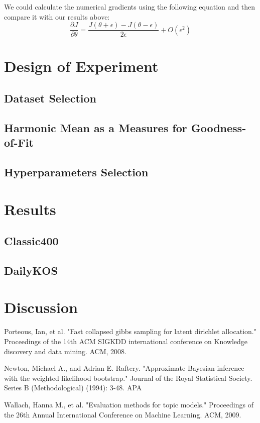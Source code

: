 \documentclass[twoside,12pt]{article}
\begin{document}
We could calculate the numerical gradients using the following equation and then compare it with our results above:
\begin{equation}
\frac{\partial J}{\partial \theta}=\frac{J(\theta+\epsilon)-J(\theta-\epsilon)}{2\epsilon}+O(\epsilon^2)
\end{equation}
\section{Design of Experiment}
\subsection{Dataset Selection}
\subsection{Harmonic Mean  as a Measures for Goodness-of-Fit}
\subsection{Hyperparameters Selection}
\section{Results}
\subsection{Classic400}
\subsection{DailyKOS}

\section{Discussion}



\begin{thebibliography}{9}
Porteous, Ian, et al. "Fast collapsed gibbs sampling for latent dirichlet allocation." Proceedings of the 14th ACM SIGKDD international conference on Knowledge discovery and data mining. ACM, 2008.


Newton, Michael A., and Adrian E. Raftery. "Approximate Bayesian inference with the weighted likelihood bootstrap." Journal of the Royal Statistical Society. Series B (Methodological) (1994): 3-48.
APA	

Wallach, Hanna M., et al. "Evaluation methods for topic models." Proceedings of the 26th Annual International Conference on Machine Learning. ACM, 2009.

\end{thebibliography}
\end{document}
